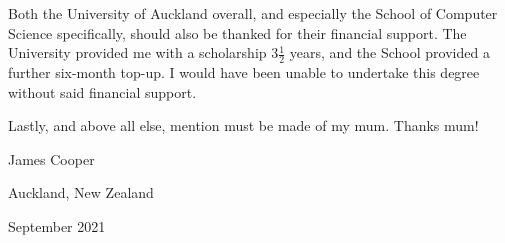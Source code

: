 Both the University of Auckland overall, and especially the School of Computer Science specifically, should also be thanked for their financial support.  The University provided me with a scholarship \(3\frac{1}{2}\) years, and the School provided a further six-month top-up.  I would have been unable to undertake this degree without said financial support.


Lastly, and above all else, mention must be made of my mum.  Thanks mum!

\vspace{1cm}
\hfill James Cooper

\hfill Auckland, New Zealand

\hfill September 2021

